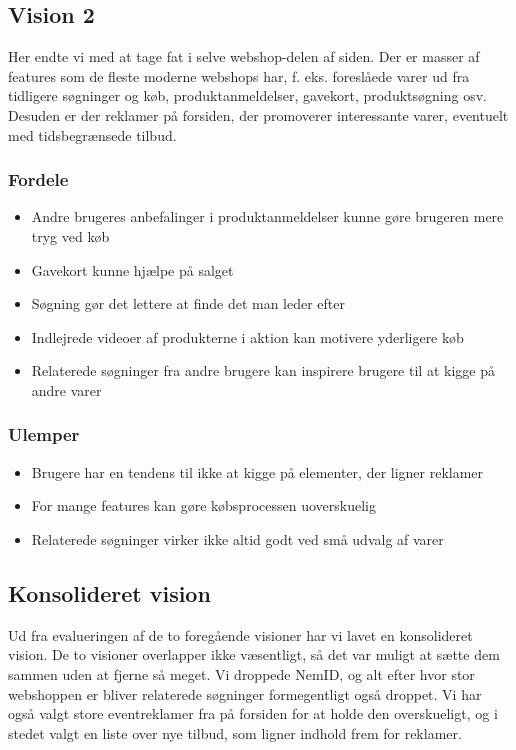 \subsection{Vision 2}
Her endte vi med at tage fat i selve webshop-delen af siden. Der er masser af features som de fleste moderne webshops har, f. eks. foreslåede varer ud fra tidligere søgninger og køb, produktanmeldelser, gavekort, produktsøgning osv. Desuden er der reklamer på forsiden, der promoverer interessante varer, eventuelt med tidsbegrænsede tilbud.

\subsubsection{Fordele}
\begin{itemize}
\item Andre brugeres anbefalinger i produktanmeldelser kunne gøre brugeren mere tryg ved køb
\item Gavekort kunne hjælpe på salget
\item Søgning gør det lettere at finde det man leder efter
\item Indlejrede videoer af produkterne i aktion kan motivere yderligere køb
\item Relaterede søgninger fra andre brugere kan inspirere brugere til at kigge på andre varer
\end{itemize}

\subsubsection{Ulemper}
\begin{itemize}
\item Brugere har en tendens til ikke at kigge på elementer, der ligner reklamer \cite{Grue}
\item For mange features kan gøre købsprocessen uoverskuelig
\item Relaterede søgninger virker ikke altid godt ved små udvalg af varer
\end{itemize}

\subsection{Konsolideret vision}
Ud fra evalueringen af de to foregående visioner har vi lavet en konsolideret vision. De to visioner overlapper ikke væsentligt, så det var muligt at sætte dem sammen uden at fjerne så meget. Vi droppede NemID, og alt efter hvor stor webshoppen er bliver relaterede søgninger formegentligt også droppet. Vi har også valgt store eventreklamer fra på forsiden for at holde den overskueligt, og i stedet valgt en liste over nye tilbud, som ligner indhold frem for reklamer.
